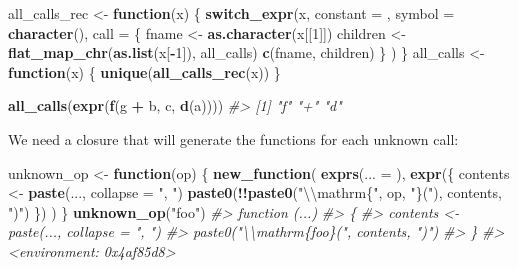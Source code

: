 \documentclass[]{book}
\newenvironment{Shaded}{\begin{snugshade}}{\end{snugshade}}
\newcommand{\CharTok}[1]{\textcolor[rgb]{0.5,0.5,0.5}{#1}}
\newcommand{\CommentTok}[1]{\textcolor[rgb]{0.37,0.37,0.37}{\textit{#1}}}
\newcommand{\ControlFlowTok}[1]{\textcolor[rgb]{0.27,0.27,0.27}{\textbf{#1}}}
\newcommand{\DataTypeTok}[1]{\textcolor[rgb]{0.27,0.27,0.27}{#1}}
\newcommand{\DecValTok}[1]{\textcolor[rgb]{0.06,0.06,0.06}{#1}}
\newcommand{\KeywordTok}[1]{\textcolor[rgb]{0.27,0.27,0.27}{\textbf{#1}}}
\newcommand{\NormalTok}[1]{#1}
\newcommand{\OperatorTok}[1]{\textcolor[rgb]{0.43,0.43,0.43}{\textbf{#1}}}
\newcommand{\StringTok}[1]{\textcolor[rgb]{0.5,0.5,0.5}{#1}}
\begin{document}
\begin{Shaded}
\begin{Highlighting}[]
\NormalTok{all_calls_rec <-}\StringTok{ }\ControlFlowTok{function}\NormalTok{(x) \{}
  \KeywordTok{switch_expr}\NormalTok{(x,}
    \DataTypeTok{constant =}\NormalTok{ ,}
    \DataTypeTok{symbol =}   \KeywordTok{character}\NormalTok{(),}
    \DataTypeTok{call =}\NormalTok{ \{}
\NormalTok{      fname <-}\StringTok{ }\KeywordTok{as.character}\NormalTok{(x[[}\DecValTok{1}\NormalTok{]])}
\NormalTok{      children <-}\StringTok{ }\KeywordTok{flat_map_chr}\NormalTok{(}\KeywordTok{as.list}\NormalTok{(x[}\OperatorTok{-}\DecValTok{1}\NormalTok{]), all_calls)}
      \KeywordTok{c}\NormalTok{(fname, children)}
\NormalTok{    \}}
\NormalTok{  )}
\NormalTok{\}}
\NormalTok{all_calls <-}\StringTok{ }\ControlFlowTok{function}\NormalTok{(x) \{}
  \KeywordTok{unique}\NormalTok{(}\KeywordTok{all_calls_rec}\NormalTok{(x))}
\NormalTok{\}}

\KeywordTok{all_calls}\NormalTok{(}\KeywordTok{expr}\NormalTok{(}\KeywordTok{f}\NormalTok{(g }\OperatorTok{+}\StringTok{ }\NormalTok{b, c, }\KeywordTok{d}\NormalTok{(a))))}
\CommentTok{#> [1] "f" "+" "d"}
\end{Highlighting}
\end{Shaded}

We need a closure that will generate the functions for each unknown call:

\begin{Shaded}
\begin{Highlighting}[]
\NormalTok{unknown_op <-}\StringTok{ }\ControlFlowTok{function}\NormalTok{(op) \{}
  \KeywordTok{new_function}\NormalTok{(}
    \KeywordTok{exprs}\NormalTok{(}\DataTypeTok{... =}\NormalTok{ ),}
    \KeywordTok{expr}\NormalTok{(\{}
\NormalTok{      contents <-}\StringTok{ }\KeywordTok{paste}\NormalTok{(..., }\DataTypeTok{collapse =} \StringTok{", "}\NormalTok{)}
      \KeywordTok{paste0}\NormalTok{(}\OperatorTok{!!}\KeywordTok{paste0}\NormalTok{(}\StringTok{"}\CharTok{\textbackslash{}\textbackslash{}}\StringTok{mathrm\{"}\NormalTok{, op, }\StringTok{"\}("}\NormalTok{), contents, }\StringTok{")"}\NormalTok{)}
\NormalTok{    \})}
\NormalTok{  )}
\NormalTok{\}}
\KeywordTok{unknown_op}\NormalTok{(}\StringTok{"foo"}\NormalTok{)}
\CommentTok{#> function (...) }
\CommentTok{#> \{}
\CommentTok{#>     contents <- paste(..., collapse = ", ")}
\CommentTok{#>     paste0("\textbackslash{}\textbackslash{}mathrm\{foo\}(", contents, ")")}
\CommentTok{#> \}}
\CommentTok{#> <environment: 0x4af85d8>}
\end{Highlighting}
\end{Shaded}
\end{document}
